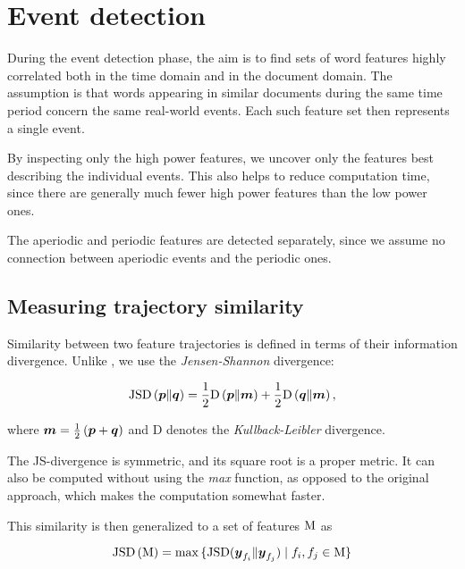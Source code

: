 \section{Event detection}

During the event detection phase, the aim is to find sets of word features highly correlated both in the time domain and in the document domain. The assumption is that words appearing in similar documents during the same time period concern the same real-world events. Each such feature set then represents a single event.

By inspecting only the high power features, we uncover only the features best describing the individual events. This also helps to reduce computation time, since there are generally much fewer high power features than the low power ones.

The aperiodic and periodic features are detected separately, since we assume no connection between aperiodic events and the periodic ones.


\subsection{Measuring trajectory similarity}

Similarity between two feature trajectories is defined in terms of their information divergence. Unlike \cite{event-detection}, we use the \textit{Jensen-Shannon} divergence:

\begin{equation*}
	\featsim \left( \vect{p} \| \vect{q} \right) = \frac{1}{2} \text{D} \left( \vect{p} \| \vect{m} \right) + \frac{1}{2} \text{D} \left( \vect{q} \| \vect{m} \right),
\end{equation*}

where $\vect{m} = \frac{1}{2} \left( \vect{p} + \vect{q} \right)$ and D denotes the \textit{Kullback-Leibler} divergence.

The JS-divergence is symmetric, and its square root is a proper metric. It can also be computed without using the \textit{max} function, as opposed to the original approach, which makes the computation somewhat faster.

This similarity is then generalized to a set of features $\text{M}$ as

\begin{equation}
	\featsim \left( \featset \right) = \max{ \{ \featsim ( \vect{y}_{f_{i}} \| \vect{y}_{f_{j}} ) \mid f_{i}, f_{j} \in \featset \} }
\end{equation}



